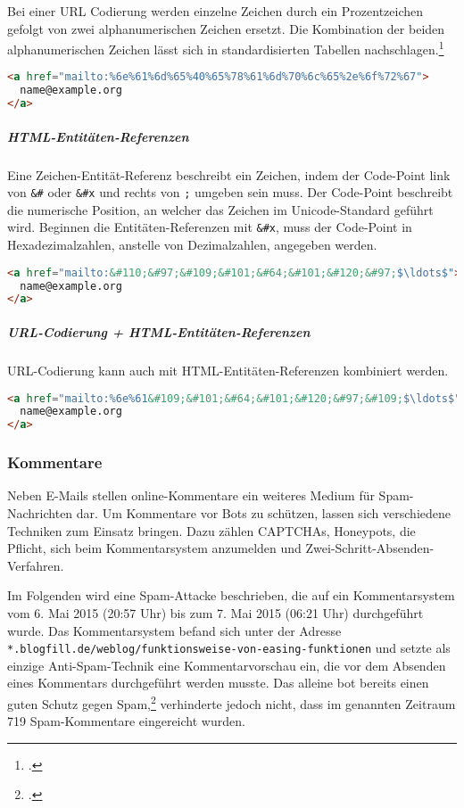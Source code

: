 Bei einer URL Codierung werden einzelne Zeichen durch ein Prozentzeichen
gefolgt von zwei alphanumerischen Zeichen ersetzt. Die Kombination der beiden
alphanumerischen Zeichen lässt sich in standardisierten Tabellen
nachschlagen.\footcite{rfc:3986}

\begin{lstlisting}[language=HTML]
<a href="mailto:%6e%61%6d%65%40%65%78%61%6d%70%6c%65%2e%6f%72%67">
  name@example.org
</a>
\end{lstlisting}

\subparagraph{HTML-Entitäten-Referenzen}
\label{spar:html-entitaeten-referenzen}

Eine Zeichen-Entität-Referenz beschreibt ein Zeichen, indem der Code-Point link
von \texttt{\&\#} oder \texttt{\&\#x} und rechts von \texttt{;} umgeben sein
muss. Der Code-Point beschreibt die numerische Position, an welcher das Zeichen
im Unicode-Standard geführt wird. Beginnen die Entitäten-Referenzen mit
\texttt{\&\#x}, muss der Code-Point in Hexadezimalzahlen, anstelle von
Dezimalzahlen, angegeben werden.

\begin{lstlisting}[language=HTML,escapechar=\$]
<a href="mailto:&#110;&#97;&#109;&#101;&#64;&#101;&#120;&#97;$\ldots$">
  name@example.org
</a>
\end{lstlisting}

\subparagraph{URL-Codierung + HTML-Entitäten-Referenzen}
\label{spar:url-codierung-html-entitaeten-referenzen}

URL-Codierung kann auch mit HTML-Entitäten-Referenzen kombiniert werden.

\begin{lstlisting}[language=HTML,escapechar=\$]
<a href="mailto:%6e%61&#109;&#101;&#64;&#101;&#120;&#97;&#109;$\ldots$">
  name@example.org
</a>
\end{lstlisting}

\subsubsection{Kommentare}
\label{ssub:kommentare}

Neben E-Mails stellen online-Kommentare ein weiteres Medium für
Spam-Nachrichten dar. Um Kommentare vor Bots zu schützen, lassen sich
verschiedene Techniken zum Einsatz bringen. Dazu zählen
CAPTCHAs, Honeypots, die Pflicht,
sich beim Kommentarsystem anzumelden und Zwei-Schritt-Absenden-Verfahren.

Im Folgenden wird eine Spam-Attacke beschrieben, die auf ein Kommentarsystem
vom 6. Mai 2015 (20:57 Uhr) bis zum 7. Mai 2015 (06:21 Uhr) durchgeführt wurde.
Das Kommentarsystem befand sich unter der Adresse
\texttt{*.blogfill.de/weblog/funktionsweise-von-easing-funktionen} und setzte
als einzige Anti-Spam-Technik eine Kommentarvorschau ein, die vor dem Absenden
eines Kommentars durchgeführt werden musste. Das alleine bot bereits einen
guten Schutz gegen Spam,\footcite{howSkipCommentPreview} verhinderte jedoch
nicht, dass im genannten Zeitraum 719 Spam-Kommentare eingereicht wurden.

